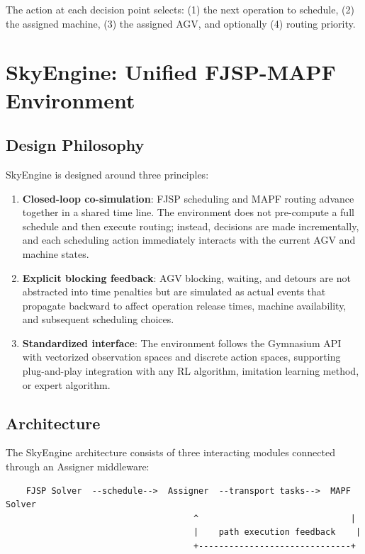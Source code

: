 \documentclass[11pt,a4paper]{article}
\begin{document}
The action at each decision point selects: (1) the next operation to schedule, (2) the assigned machine, (3) the assigned AGV, and optionally (4) routing priority.


\section{SkyEngine: Unified FJSP-MAPF Environment}
\label{sec:skyengine}

\subsection{Design Philosophy}

SkyEngine is designed around three principles:

\begin{enumerate}[leftmargin=*]
    \item \textbf{Closed-loop co-simulation}: FJSP scheduling and MAPF routing advance together in a shared time line. The environment does not pre-compute a full schedule and then execute routing; instead, decisions are made incrementally, and each scheduling action immediately interacts with the current AGV and machine states.
    \item \textbf{Explicit blocking feedback}: AGV blocking, waiting, and detours are not abstracted into time penalties but are simulated as actual events that propagate backward to affect operation release times, machine availability, and subsequent scheduling choices.
    \item \textbf{Standardized interface}: The environment follows the Gymnasium API with vectorized observation spaces and discrete action spaces, supporting plug-and-play integration with any RL algorithm, imitation learning method, or expert algorithm.
\end{enumerate}

\subsection{Architecture}

The SkyEngine architecture consists of three interacting modules connected through an Assigner middleware:

\begin{verbatim}
    FJSP Solver  --schedule-->  Assigner  --transport tasks-->  MAPF Solver
                                     ^                              |
                                     |    path execution feedback    |
                                     +------------------------------+
\end{verbatim}
\end{document}
